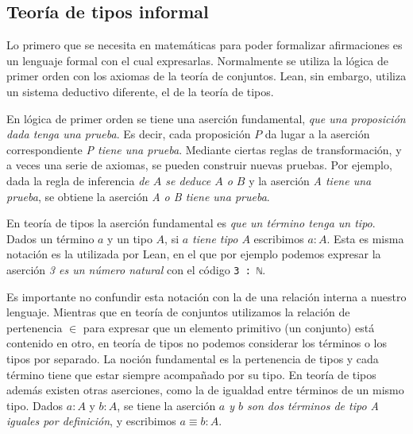 


\subsection{Teoría de tipos informal}

Lo primero que se necesita en matemáticas para poder formalizar afirmaciones es
un lenguaje formal con el cual expresarlas. Normalmente se utiliza la lógica de
primer orden con los axiomas de la teoría de conjuntos. Lean, sin embargo,
utiliza un sistema deductivo diferente, el de la teoría de tipos.

En lógica de primer orden se tiene una aserción fundamental, \textit{que una
	proposición dada tenga una prueba}. Es decir, cada proposición $P$ da lugar a la
aserción correspondiente \textit{P tiene una prueba}. Mediante ciertas reglas de
transformación, y a veces una serie de axiomas, se pueden construir nuevas
pruebas. Por ejemplo, dada la regla de inferencia \textit{de $A$ se deduce $A$ o
	$B$} y la aserción \textit{A tiene una prueba}, se obtiene la aserción \textit{A
	o B tiene una prueba}.

En teoría de tipos la aserción fundamental es \textit{que un término tenga un
	tipo}. Dados un término $a$ y un tipo $A$, si \textit{$a$ tiene tipo $A$}
escribimos $a:A$. Esta es misma notación es la utilizada por Lean, en el que por
ejemplo podemos expresar la aserción \textit{3 es un número natural} con el
código \lstinline{3 : ℕ}.

Es importante no confundir esta notación con la de una
relación interna a nuestro lenguaje. Mientras que en teoría de conjuntos
utilizamos la relación de pertenencia $\in$ para expresar que un elemento
primitivo (un conjunto) está contenido en otro, en teoría de tipos no podemos
considerar los términos o los tipos por separado. La noción fundamental es la
pertenencia de tipos y cada término tiene que estar siempre acompañado por su
tipo. En teoría de tipos además existen otras aserciones, como la de igualdad
entre términos de un mismo tipo. Dados $a:A$ y $b:A$, se tiene la aserción
\textit{$a$ y $b$ son dos términos de tipo A iguales por definición}, y
escribimos $a\equiv b : A$.

